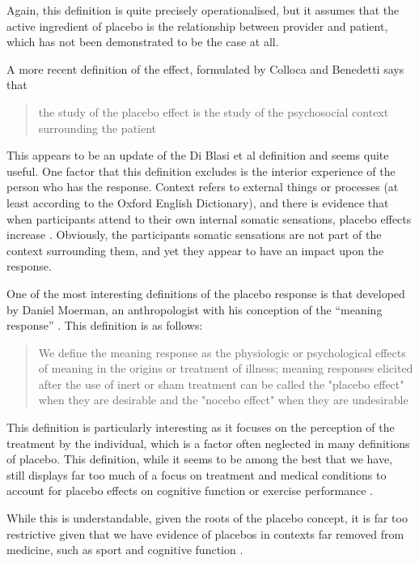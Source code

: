 Again, this definition is quite precisely operationalised, but it assumes that the active ingredient of placebo is the relationship between provider and patient, which has not been demonstrated to be the case at all. 


A more recent definition of the effect, formulated by Colloca and Benedetti
 \cite{Colloca2005}  says that 

\begin{quotation}
the study of the placebo effect is the study of the psychosocial context
  surrounding the patient
\end{quotation}


This appears to be an update of the Di Blasi et al  definition and seems quite useful. One factor that this definition excludes is the interior experience of the person who has the response. Context refers to external things or processes (at least according to the Oxford English Dictionary), and there is evidence that when participants attend to their own internal somatic sensations, placebo effects increase \cite{Geers2006}. Obviously, the participants somatic sensations are not part of the context surrounding them, and yet they appear to have an impact upon the response. 


One of the most interesting definitions of the placebo response is that developed by Daniel Moerman, an anthropologist with his conception of the ``meaning response'' \cite{Moerman2002b,Moerman2002a}. 
This definition is as follows: 

\begin{quotation}
  We define the meaning response as the physiologic or psychological
  effects of meaning in the origins or treatment of illness; meaning
  responses elicited after the use of inert or sham treatment can be
  called the "placebo effect" when they are desirable and the "nocebo
  effect" when they are undesirable
\end{quotation}

This definition is particularly interesting as it focuses on the perception of the treatment by the individual, which is a factor often neglected in many definitions of placebo.  This definition, while it seems to be among the best that we have, still displays far too much of a focus on treatment and medical conditions to account for placebo effects on cognitive function or exercise performance \cite{Crum2007} . 

 While this is understandable, given the roots of the placebo concept, it is far too restrictive given that we have evidence of placebos in contexts far removed from medicine, such as sport and cognitive function \cite{Benedetti2007a,Oken2008}. 

